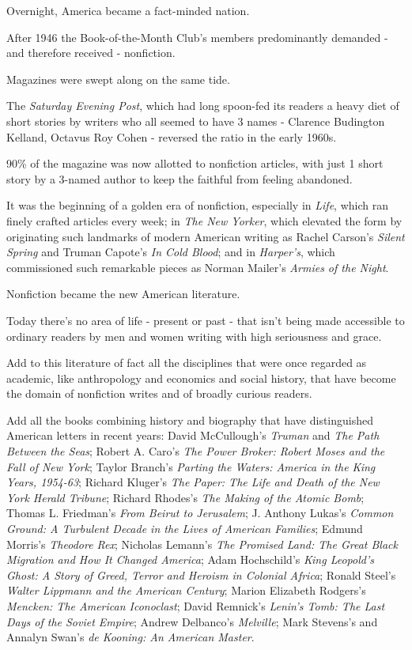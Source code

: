 \documentclass{book}
\numberwithin{equation}{section}
\begin{document}
Overnight, America became a fact-minded nation.

After 1946 the Book-of-the-Month Club's members predominantly demanded - and therefore received - nonfiction.

%
Magazines were swept along on the same tide.

The \textit{Saturday Evening Post}, which had long spoon-fed its readers a heavy diet of short stories by writers who all seemed to have 3 names - Clarence Budington Kelland, Octavus Roy Cohen - reversed the ratio in the early 1960s.

90\% of the magazine was now allotted to nonfiction articles, with just 1 short story by a 3-named author to keep the faithful from feeling abandoned.

It was the beginning of a golden era of nonfiction, especially in \textit{Life}, which ran finely crafted articles every week; in \textit{The New Yorker}, which elevated the form by originating such landmarks of modern American writing as Rachel Carson's \textit{Silent Spring} and Truman Capote's \textit{In Cold Blood}; and in \textit{Harper's}, which commissioned such remarkable pieces as Norman Mailer's \textit{Armies of the Night}.

Nonfiction became the new American literature.

%
Today there's no area of life - present or past - that isn't being made accessible to ordinary readers by men and women writing with high seriousness and grace.

Add to this literature of fact all the disciplines that were once regarded as academic, like anthropology and economics and social history, that have become the domain of nonfiction writes and of broadly curious readers.

Add all the books combining history and biography that have distinguished American letters in recent years: David McCullough's \textit{Truman} and \textit{The Path Between the Seas}; Robert A. Caro's \textit{The Power Broker: Robert Moses and the Fall of New York}; Taylor Branch's \textit{Parting the Waters: America in the King Years, 1954-63}; Richard Kluger's \textit{The Paper: The Life and Death of the New York Herald Tribune}; Richard Rhodes's \textit{The Making of the Atomic Bomb}; Thomas L. Friedman's \textit{From Beirut to Jerusalem}; J. Anthony Lukas's \textit{Common Ground: A Turbulent Decade in the Lives of American Families}; Edmund Morris's \textit{Theodore Rex}; Nicholas Lemann's \textit{The Promised Land: The Great Black Migration and How It Changed America}; Adam Hochschild's \textit{King Leopold's Ghost: A Story of Greed, Terror and Heroism in Colonial Africa}; Ronald Steel's \textit{Walter Lippmann and the American Century}; Marion Elizabeth Rodgers's \textit{Mencken: The American Iconoclast}; David Remnick's \textit{Lenin's Tomb: The Last Days of the Soviet Empire}; Andrew Delbanco's \textit{Melville}; Mark Stevens's and Annalyn Swan's \textit{de Kooning: An American Master}.
\end{document}
